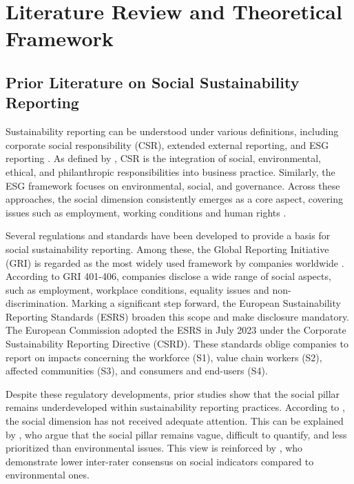\chapter{Literature Review and Theoretical Framework}
\label{chap:background}
\section{Prior Literature on Social Sustainability Reporting}

Sustainability reporting can be understood under various definitions, 
including corporate social responsibility (CSR), extended external reporting, 
and ESG reporting \parencite{Edge2022}. As defined by \parencite{Rasche2017}, CSR is the integration of social, 
environmental, ethical, and philanthropic responsibilities into business practice. 
Similarly, the ESG framework focuses on environmental, social, and governance. 
Across these approaches, the social dimension consistently emerges as a core aspect,
covering issues such as employment, working conditions and human rights \parencite{Fiechter2022, Morais2018}.

Several regulations and standards have been developed to provide a basis for social sustainability reporting.
Among these, the Global Reporting Initiative (GRI) is regarded as the most widely used framework 
by companies worldwide \parencite{Bais2024, vanOorschot2024}. 
According to GRI 401-406, companies disclose a wide range of social aspects, such as employment,
workplace conditions, equality issues and non-discrimination.
Marking a significant step forward, the European Sustainability Reporting Standards (ESRS) 
broaden this scope and make disclosure mandatory. The European Commission adopted the ESRS 
in July 2023 under the Corporate Sustainability Reporting Directive (CSRD). These standards 
oblige companies to report on impacts concerning the workforce (S1), value chain workers (S2), 
affected communities (S3), and consumers and end-users (S4).

Despite these regulatory developments, prior studies show that the social pillar remains underdeveloped 
within sustainability reporting practices. According to \textcite{Heldal2024}, the social dimension 
has not received adequate attention. This can be explained by \textcite{Morais2018}, 
who argue that the social pillar remains vague, difficult to quantify, and less prioritized than 
environmental issues. This view is reinforced by \textcite{Berg2022}, who demonstrate lower inter-rater 
consensus on social indicators compared to environmental ones.


